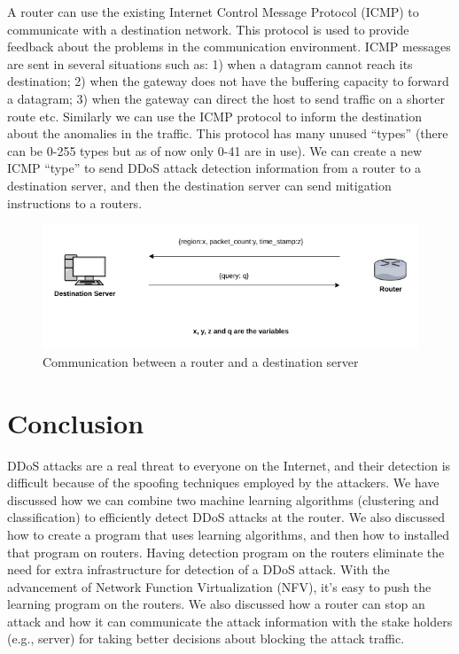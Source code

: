 \documentclass[12pt,oneside,a4paper]{article}
\begin{document}
A router can use the existing Internet Control Message Protocol (ICMP) to communicate with a destination network. This protocol is used to provide feedback about the problems in the communication environment. ICMP messages are sent in several situations such as: 1) when a datagram cannot reach its destination; 2) when the gateway does not have the buffering capacity to forward a datagram; 3) when the gateway can direct the host to send traffic on a shorter route etc.\cite{icmp} Similarly we can use the ICMP protocol to inform the destination about the anomalies in the traffic. This protocol has many unused ``types'' (there can be 0-255 types but as of now only 0-41 are in use). We can create a new ICMP ``type'' to send DDoS attack detection information from a router to a destination server, and then the destination server can send mitigation instructions to a routers.

\begin{figure}[H]
\centering
\includegraphics[scale=0.5]{router-network-communication.png}
\caption{Communication between a router and a destination server} \label{fig:router-network-communication}
\end{figure}

\pagebreak
\section{Conclusion}

DDoS attacks are a real threat to everyone on the Internet, and their detection is difficult because of the spoofing techniques employed by the attackers. We have discussed how we can combine two machine learning algorithms (clustering and classification) to efficiently detect DDoS attacks at the router. We also discussed how to create a program that uses learning algorithms, and then how to installed that program on routers. Having detection program on the routers eliminate the need for extra infrastructure for detection of a DDoS attack. With the advancement of Network Function Virtualization (NFV), it's easy to push the learning program on the routers. We also discussed how a router can stop an attack and how it can communicate the attack information with the stake holders (e.g., server) for taking better decisions about blocking the attack traffic.
\pagebreak

\singlespacing
\end{document}
